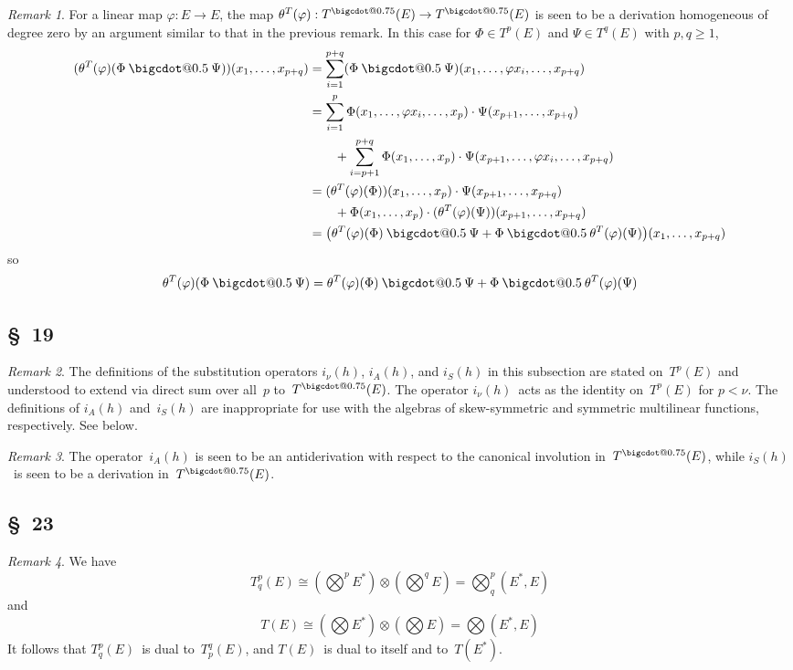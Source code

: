\documentclass[letterpaper,12pt]{article}
\makeatletter
\newcommand{\iso}{\cong}
\newcommand{\bigcdot}[1]{\mathbin{\mathpalette\bigcdot@{#1}}}
\newcommand{\bigcdot@}[2]{%
  \sbox0{$#1\vcenter{}$}%
  \sbox2{$#1\cdot\m@th$}%
  \hbox{%
    \hfil
    \raise\ht0\hbox{%
      \scalebox{#2}{%
        \lower\ht0\hbox{$#1\bullet\m@th$}%
      }%
    }%
    \hfil
  }%
}
\newcommand{\mult}{\cdot}
\newcommand{\tprod}{\otimes}
\newcommand{\bigtprod}{\bigotimes}
\newcommand{\medtprod}{{\textstyle\bigtprod}}
\newcommand{\fprod}{\bigcdot{0.5}}
\newcommand{\tdot}{\bigcdot{0.75}}
\theoremstyle{definition}
\theoremstyle{remark}
\newtheorem*{rmk}{Remark}
\makeatother
\begin{document}
\begin{rmk}
For a linear map \(\varphi:E\to E\), the map \(\theta^T(\varphi):T^{\tdot}(E)\to T^{\tdot}(E)\) is seen to be a derivation homogeneous of degree zero by an argument similar to that in the previous remark. In this case for \(\Phi\in T^p(E)\) and \(\Psi\in T^q(E)\) with \(p,q\ge 1\),
\begin{align*}
(\theta^T(\varphi)(\Phi\fprod\Psi))(x_1,\ldots,x_{p+q})&=\sum_{i=1}^{p+q}(\Phi\fprod\Psi)(x_1,\ldots,\varphi x_i,\ldots,x_{p+q})\\
	&=\sum_{i=1}^{p}\Phi(x_1,\ldots,\varphi x_i,\ldots,x_p)\mult\Psi(x_{p+1},\ldots,x_{p+q})\\
	&\qquad+\sum_{i=p+1}^{p+q}\Phi(x_1,\ldots,x_p)\mult\Psi(x_{p+1},\ldots,\varphi x_i,\ldots,x_{p+q})\\
	&=(\theta^T(\varphi)(\Phi))(x_1,\ldots,x_p)\mult\Psi(x_{p+1},\ldots,x_{p+q})\\
	&\qquad+\Phi(x_1,\ldots,x_p)\mult(\theta^T(\varphi)(\Psi))(x_{p+1},\ldots,x_{p+q})\\
	&=\bigl(\theta^T(\varphi)(\Phi)\fprod\Psi+\Phi\fprod\theta^T(\varphi)(\Psi)\bigr)(x_1,\ldots,x_{p+q})
\end{align*}
so
\[\theta^T(\varphi)(\Phi\fprod\Psi)=\theta^T(\varphi)(\Phi)\fprod\Psi+\Phi\fprod\theta^T(\varphi)(\Psi)\]
\end{rmk}

\subsection*{\S~19}
\begin{rmk}
The definitions of the substitution operators \(i_{\nu}(h)\), \(i_A(h)\), and \(i_S(h)\) in this subsection are stated on~\(T^p(E)\) and understood to extend via direct sum over all~\(p\) to~\(T^{\tdot}(E)\). The operator \(i_{\nu}(h)\)~acts as the identity on~\(T^p(E)\) for \(p<\nu\). The definitions of \(i_A(h)\) and~\(i_S(h)\) are inappropriate for use with the algebras of skew-symmetric and symmetric multilinear functions, respectively. See below.
\end{rmk}

\begin{rmk}
The operator~\(i_A(h)\) is seen to be an antiderivation with respect to the canonical involution in~\(T^{\tdot}(E)\), while \(i_S(h)\)~is seen to be a derivation in~\(T^{\tdot}(E)\).
\end{rmk}

\subsection*{\S~23}
\begin{rmk}
We have
\[T^p_q(E)\iso(\medtprod^pE^*)\tprod(\medtprod^q E)=\medtprod^p_q(E^*,E)\]
and
\[T(E)\iso(\medtprod E^*)\tprod(\medtprod E)=\medtprod(E^*,E)\]
It follows that \(T^p_q(E)\)~is dual to~\(T^q_p(E)\), and \(T(E)\)~is dual to itself and to~\(T(E^*)\).
\end{rmk}
\end{document}
